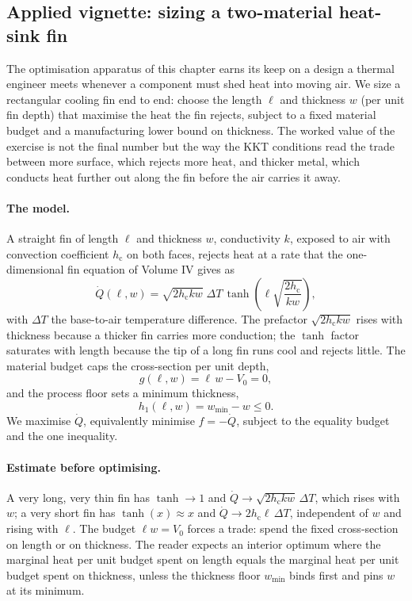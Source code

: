 \subsection{Applied vignette: sizing a two-material heat-sink fin}

The optimisation apparatus of this chapter earns its keep on a design a
thermal engineer meets whenever a component must shed heat into moving
air. We size a rectangular cooling fin end to end: choose the length
$\ell$ and thickness $w$ (per unit fin depth) that maximise the heat the
fin rejects, subject to a fixed material budget and a manufacturing
lower bound on thickness. The worked value of the exercise is not the
final number but the way the KKT conditions read the trade between more
surface, which rejects more heat, and thicker metal, which conducts heat
further out along the fin before the air carries it away.

\paragraph{The model.} A straight fin of length $\ell$ and thickness $w$,
conductivity $k$, exposed to air with convection coefficient
$h_{\mathrm{c}}$ on both faces, rejects heat at a rate that the
one-dimensional fin equation of Volume IV gives as
\[
\dot{Q}(\ell, w) = \sqrt{2 h_{\mathrm{c}} k w}\;\Delta T\,
\tanh\!\left(\ell\sqrt{\frac{2 h_{\mathrm{c}}}{k w}}\right),
\]
with $\Delta T$ the base-to-air temperature difference. The prefactor
$\sqrt{2 h_{\mathrm{c}} k w}$ rises with thickness because a thicker fin
carries more conduction; the $\tanh$ factor saturates with length
because the tip of a long fin runs cool and rejects little. The material
budget caps the cross-section per unit depth,
\[
g(\ell, w) = \ell\,w - V_{0} = 0,
\]
and the process floor sets a minimum thickness,
\[
h_{1}(\ell, w) = w_{\min} - w \leq 0.
\]
We maximise $\dot{Q}$, equivalently minimise $f = -\dot{Q}$, subject to
the equality budget and the one inequality.

\paragraph{Estimate before optimising.} A very long, very thin fin has
$\tanh \to 1$ and $\dot{Q} \to \sqrt{2 h_{\mathrm{c}} k w}\,\Delta T$,
which rises with $w$; a very short fin has $\tanh(x) \approx x$ and
$\dot{Q} \to 2 h_{\mathrm{c}}\ell\,\Delta T$, independent of $w$ and
rising with $\ell$. The budget $\ell w = V_{0}$ forces a trade: spend
the fixed cross-section on length or on thickness. The reader expects an
interior optimum where the marginal heat per unit budget spent on length
equals the marginal heat per unit budget spent on thickness, unless the
thickness floor $w_{\min}$ binds first and pins $w$ at its minimum.

